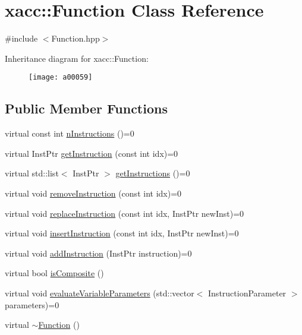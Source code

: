\hypertarget{a00059}{}\section{xacc\+:\+:Function Class Reference}
\label{a00059}


{\ttfamily \#include $<$Function.\+hpp$>$}

Inheritance diagram for xacc\+:\+:Function\+:\begin{figure}[H]
\begin{center}
\leavevmode
\texttt{[image: a00059]}
\end{center}
\end{figure}
\subsection*{Public Member Functions}
\begin{DoxyCompactItemize}
\item 
virtual const int \hyperlink{a00059_a8901985525f59713e14c61713e07c086}{n\+Instructions} ()=0
\item 
virtual Inst\+Ptr \hyperlink{a00059_afa549fc91b5a05f26d8139954a7e0ed5}{get\+Instruction} (const int idx)=0
\item 
virtual std\+::list$<$ Inst\+Ptr $>$ \hyperlink{a00059_aaf80bd3d49113a92b520785572663032}{get\+Instructions} ()=0
\item 
virtual void \hyperlink{a00059_ab6478b09bb28e194bb555b3180737733}{remove\+Instruction} (const int idx)=0
\item 
virtual void \hyperlink{a00059_a2ef6a4923a6734f90f6ee3d94d263af0}{replace\+Instruction} (const int idx, Inst\+Ptr new\+Inst)=0
\item 
virtual void \hyperlink{a00059_acde702e44bdbc2759b338365218d7ebe}{insert\+Instruction} (const int idx, Inst\+Ptr new\+Inst)=0
\item 
virtual void \hyperlink{a00059_aa8c9ec2d08be75c69399d4254b0216f5}{add\+Instruction} (Inst\+Ptr instruction)=0
\item 
virtual bool \hyperlink{a00059_aa75500c657b5c3e0e36213e1506aad97}{is\+Composite} ()
\item 
virtual void \hyperlink{a00059_af6ae9453027789a2aaec30e59c9e45e3}{evaluate\+Variable\+Parameters} (std\+::vector$<$ Instruction\+Parameter $>$ parameters)=0
\item 
virtual \hyperlink{a00059_a04b25ba4da1ddfa4ec4ec6d6ffb25bc3}{$\sim$\+Function} ()
\end{DoxyCompactItemize}
